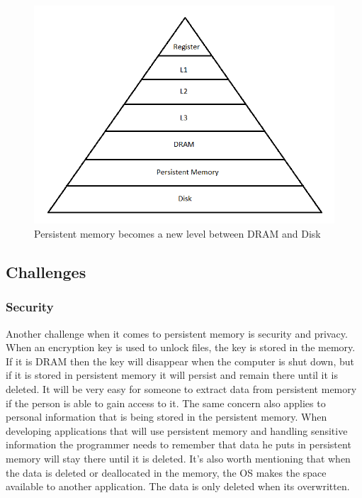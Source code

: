 \documentclass[12pt,a4paper,USenglish]{article}      %
\begin{document}
\begin{figure}[!hbtp]
\includegraphics[scale=0.85]{Intro/Pyramid.png}
\caption{Persistent memory becomes a new level between DRAM and Disk\cite{optane}}
\label{fig:Pyramid}
\end{figure}

\subsection{Challenges}

\subsubsection{Security}
Another challenge when it comes to persistent memory is security and privacy\cite{Badam}. When an encryption key is used to unlock files, the key is stored in the memory. If it is DRAM then the key will disappear when the computer is shut down, but if it is stored in persistent memory it will persist and remain there until it is deleted. It will be very easy for someone to extract data from persistent memory if the person is able to gain access to it. The same concern also applies to personal information that is being stored in the persistent memory. When developing applications that will use persistent memory and handling sensitive information the programmer needs to remember that data he puts in persistent memory will stay there until it is deleted. It’s also worth mentioning that when the data is deleted or deallocated in the memory, the OS makes the space available to another application. The data is only deleted when its overwritten.
\end{document}
